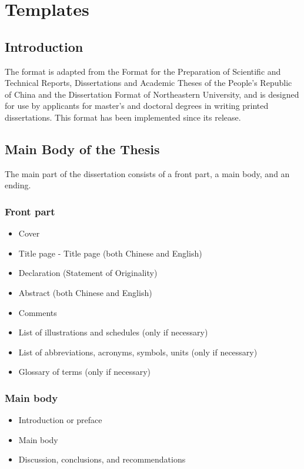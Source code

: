 \chapter{Templates}\label{chap:format}

\section{Introduction}
The format is adapted from the Format for the Preparation of Scientific and Technical Reports, Dissertations and Academic Theses of the People's Republic of China and the Dissertation Format of Northeastern University, and is designed for use by applicants for master's and doctoral degrees in writing printed dissertations. This format has been implemented since its release.
\section{Main Body of the Thesis}
The main part of the dissertation consists of a front part, a main body, and an ending.
\subsection{Front part}
\begin{itemize}
    \item Cover
    \item Title page - Title page (both Chinese and English)
    \item Declaration (Statement of Originality)
    \item Abstract (both Chinese and English)
    \item Comments
    \item List of illustrations and schedules (only if necessary)
    \item List of abbreviations, acronyms, symbols, units (only if necessary)
    \item Glossary of terms (only if necessary)
\end{itemize}

\subsection{Main body}
\begin{itemize}
    \item Introduction or preface
    \item Main body
    \item Discussion, conclusions, and recommendations
\end{itemize}
